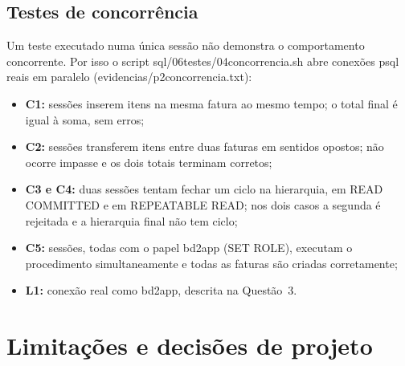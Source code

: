 \documentclass[11pt,a4paper]{article}
\newcommand{\cod}[1]{{\ttfamily\renewcommand{\_}{\textunderscore\allowbreak}#1}}
\begin{document}
\subsection{Testes de concorrência}
\label{sec:conc}

Um teste executado numa única sessão não demonstra o comportamento concorrente. Por isso o script
\cod{sql/06\_testes/04\_concorrencia.sh} abre conexões \cod{psql} reais em paralelo
(\cod{evidencias/p2\_concorrencia.txt}):

\begin{itemize}
  \item \textbf{C1:} \numSessoes{} sessões inserem itens na mesma fatura ao mesmo tempo; o total final é igual à
        soma, sem erros;
  \item \textbf{C2:} \numSessoes{} sessões transferem itens entre duas faturas em sentidos opostos; não ocorre
        impasse e os dois totais terminam corretos;
  \item \textbf{C3 e C4:} duas sessões tentam fechar um ciclo na hierarquia, em \cod{READ COMMITTED} e em
        \cod{REPEATABLE READ}; nos dois casos a segunda é rejeitada e a hierarquia final não tem ciclo;
  \item \textbf{C5:} \numSessoes{} sessões, todas com o papel \cod{bd2\_app} (\cod{SET ROLE}), executam o procedimento
        simultaneamente e todas as faturas são criadas corretamente;
  \item \textbf{L1:} conexão real como \cod{bd2\_app}, descrita na Questão~3.
\end{itemize}

\section{Limitações e decisões de projeto}
\end{document}
